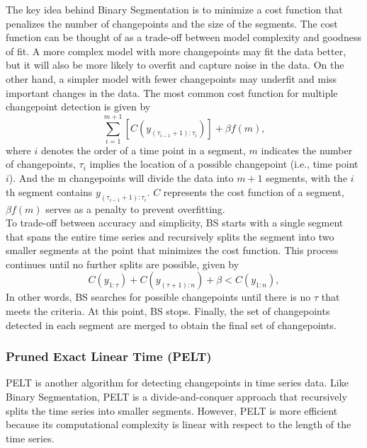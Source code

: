 \documentclass[]{interact}
\theoremstyle{plain}%
\theoremstyle{definition}
\theoremstyle{remark}
\begin{document}
	The key idea behind Binary Segmentation is to minimize a cost function that penalizes the number of changepoints and the size of the segments. The cost function can be thought of as a trade-off between model complexity and goodness of fit. A more complex model with more changepoints may fit the data better, but it will also be more likely to overfit and capture noise in the data. On the other hand, a simpler model with fewer changepoints may underfit and miss important changes in the data. The most common cost function for multiple changepoint detection is given by
	\begin{equation} \label{4}
		\sum_{i = 1} ^{m + 1} \left[C(y_{({\tau_{i-1} + 1}):\tau_{i}}) \right] + \beta f(m),
	\end{equation}
	where $i$ denotes the order of a time point in a segment, $m$ indicates the number of changepoints, $\tau_i$ implies the location of a possible changepoint (i.e., time point $i$). And the m changepoints will divide the data into $m+1$ segments, with the $i$th segment contains $y_{({\tau_{i-1} + 1}):\tau_{i}}$. $C$ represents the cost function of a segment, $\beta f(m)$ serves as a penalty to prevent overfitting\cite{killickOptimalDetectionChangepoints2012}. \\
	
	To trade-off between accuracy and simplicity, BS starts with a single segment that spans the entire time series and recursively splits the segment into two smaller segments at the point that minimizes the cost function. This process continues until no further splits are possible, given by
	\begin{equation} \label{5}
		C(y_{1:\tau}) + C(y_{({\tau + 1}):n}) + \beta < C(y_{1:n}),
	\end{equation}
	In other words, BS searches for possible changepoints until there is no $\tau$ that meets the criteria. At this point, BS stops. Finally, the set of changepoints detected in each segment are merged to obtain the final set of changepoints.
	
	\subsubsection{Pruned Exact Linear Time (PELT)} \label{sec:PELT}
	
	
	\hspace{0.23cm} PELT is another algorithm for detecting changepoints in time series data. Like Binary Segmentation, PELT is a divide-and-conquer approach that recursively splits the time series into smaller segments. However, PELT is more efficient because its computational complexity is linear with respect to the length of the time series\cite{killickOptimalDetectionChangepoints2012}. \\
	
\end{document}
